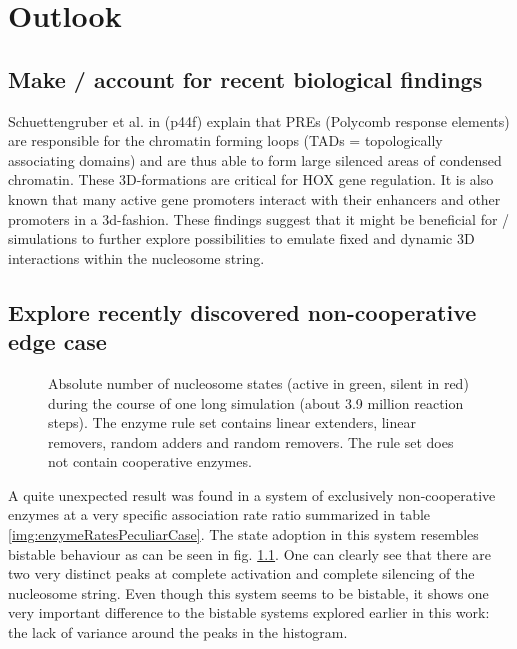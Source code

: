 \chapter{Outlook}
\label{cha:outlook}




\section{Make \ed/ account for recent biological findings}
    Schuettengruber et al. in \cite{schuettengruber2017genome} (p44f) %
    explain that PREs (Polycomb response elements) are responsible for the chromatin forming loops (TADs = topologically associating domains) and are thus able to form large silenced areas of condensed chromatin. These 3D-formations are critical for HOX gene regulation. It is also known that many active gene promoters interact with their enhancers and other promoters in a 3d-fashion. \cite{javierre2016lineage} These findings suggest that it might be beneficial for \ed/ simulations to further explore possibilities to emulate fixed and dynamic 3D interactions within the nucleosome string.
%
%
\section{Explore recently discovered non-cooperative edge case}
    \begin{figure}[htpb!]
        \centering
        \caption{Absolute number of nucleosome states (active in green, silent in red) during the course of one long simulation (about 3.9 million reaction steps). The enzyme rule set contains linear extenders, linear removers, random adders and random removers. The rule set does not contain cooperative enzymes.}
        \label{img:outlook_nonCoop}
    \end{figure}

    A quite unexpected result was found in a system of exclusively non-cooperative enzymes at a very specific association rate ratio summarized in table \ref{img:enzymeRatesPeculiarCase}. The state adoption in this system resembles bistable behaviour as can be seen in fig. \ref{img:outlook_nonCoop}. One can clearly see that there are two very distinct peaks at complete activation and complete silencing of the nucleosome string. Even though this system seems to be bistable, it shows one very important difference to the bistable systems explored earlier in this work: the lack of variance around the peaks in the histogram.

